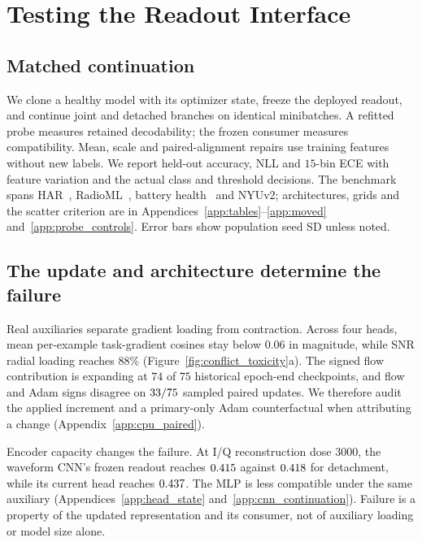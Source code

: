 \documentclass{article}
\begin{document}
\section{Testing the Readout Interface}\label{sec:experiments}\label{sec:analysis}

\subsection{Matched continuation}

We clone a healthy model with its optimizer state, freeze the deployed readout,
and continue joint and detached branches on identical minibatches. A refitted
probe measures retained decodability; the frozen consumer measures compatibility.
Mean, scale and paired-alignment repairs use training features without new labels.
We report held-out accuracy, NLL and $15$-bin ECE with feature variation and the
actual class and threshold decisions. The benchmark spans
HAR~\citep{ucihar}, RadioML~\citep{radioml}, battery health~\citep{nasa_battery}
and NYUv2; architectures, grids and the scatter criterion are in
Appendices~\ref{app:tables}--\ref{app:moved} and~\ref{app:probe_controls}.
Error bars show population seed SD unless noted.

\subsection{The update and architecture determine the failure}\label{sec:real_aux}

Real auxiliaries separate gradient loading from contraction. Across four heads,
mean per-example task-gradient cosines stay below $0.06$ in magnitude, while
SNR radial loading reaches $88\%$ (Figure~\ref{fig:conflict_toxicity}a).
The signed flow contribution is expanding at $74$ of $75$ historical
epoch-end checkpoints, and flow and Adam signs disagree on
$33/75$ sampled paired updates. We therefore
audit the applied increment and a primary-only Adam counterfactual when
attributing a change (Appendix~\ref{app:cpu_paired}).

Encoder capacity changes the failure. At I/Q reconstruction dose
$3000$, the waveform CNN's frozen readout reaches $0.415$ against
$0.418$ for detachment, while its current head reaches $0.437$.
The MLP is less compatible under the same auxiliary
(Appendices~\ref{app:head_state} and~\ref{app:cnn_continuation}). Failure is a
property of the updated representation and its consumer, not of auxiliary
loading or model size alone.
\end{document}
